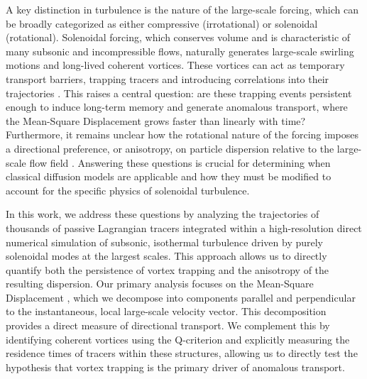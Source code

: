 \documentclass[]{article}
\begin{document}
A key distinction in turbulence is the nature of the large-scale forcing, which can be broadly categorized as either compressive (irrotational) or solenoidal (rotational). Solenoidal forcing, which conserves volume and is characteristic of many subsonic and incompressible flows, naturally generates large-scale swirling motions and long-lived coherent vortices. These vortices can act as temporary transport barriers, trapping tracers and introducing correlations into their trajectories \citep{freitas2026intermittencysuppressionturbulenceforced}. This raises a central question: are these trapping events persistent enough to induce long-term memory and generate anomalous transport, where the Mean-Square Displacement grows faster than linearly with time? Furthermore, it remains unclear how the rotational nature of the forcing imposes a directional preference, or anisotropy, on particle dispersion relative to the large-scale flow field \citep{mizerski2022anisotropicturbulentviscositylargescale}. Answering these questions is crucial for determining when classical diffusion models are applicable and how they must be modified to account for the specific physics of solenoidal turbulence.

In this work, we address these questions by analyzing the trajectories of thousands of passive Lagrangian tracers \citep{komorowski2005stationaritylagrangianobservationspassive} integrated within a high-resolution direct numerical simulation of subsonic, isothermal turbulence driven by purely solenoidal modes at the largest scales. This approach allows us to directly quantify both the persistence of vortex trapping and the anisotropy of the resulting dispersion. Our primary analysis focuses on the Mean-Square Displacement \citep{küchler2024lagrangianparticletrackinglarge}, which we decompose into components parallel and perpendicular to the instantaneous, local large-scale velocity vector. This decomposition provides a direct measure of directional transport. We complement this by identifying coherent vortices using the Q-criterion and explicitly measuring the residence times of tracers within these structures, allowing us to directly test the hypothesis that vortex trapping is the primary driver of anomalous transport.
\end{document}
